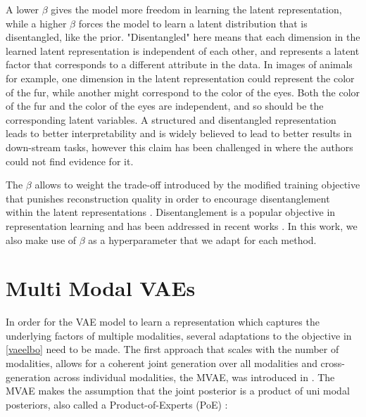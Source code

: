 A lower $\beta$ gives the model more freedom in learning the latent representation, while a higher $\beta$ forces the model to learn a latent distribution that is disentangled, like the prior.
"Disentangled" here means that each dimension in the learned latent representation is independent of each other, and represents a latent factor that corresponds to a different attribute in the data.
In images of animals for example, one dimension in the latent representation could represent the color of the fur, while another might correspond to the color of the eyes.
Both the color of the fur and the color of the eyes are independent, and so should be the corresponding latent variables.
A structured and disentangled representation leads to better interpretability and is widely believed to lead to better results in down-stream tasks, however this claim has been challenged in \citep{locatello_challenging_2019} where the authors could not find evidence for it.

The $\beta$ allows to weight the trade-off introduced by the modified training objective that punishes reconstruction quality in order to encourage disentanglement within the latent representations \citep{burgess_understanding_2018}.
Disentanglement is a popular objective in representation learning and has been addressed in recent works \parencite{chen_isolating_2019, locatello_challenging_2019}.
In this work, we also make use of $\beta$ as a hyperparameter that we adapt for each method.



\section{Multi Modal VAEs}
\label{subsec:Multi Modal VAEs}
In order for the VAE model to learn a representation which captures the underlying factors of multiple modalities, several adaptations to the objective in \cref{vaeelbo} need to be made.
The first approach that scales with the number of modalities, allows for a coherent joint generation over all modalities and cross-generation across individual modalities, the MVAE, was introduced in \citep{poe}.
The MVAE makes the assumption that the joint posterior is a product of uni modal posteriors, also called a Product-of-Experts (PoE) \parencite{hinton_training_2002}:

